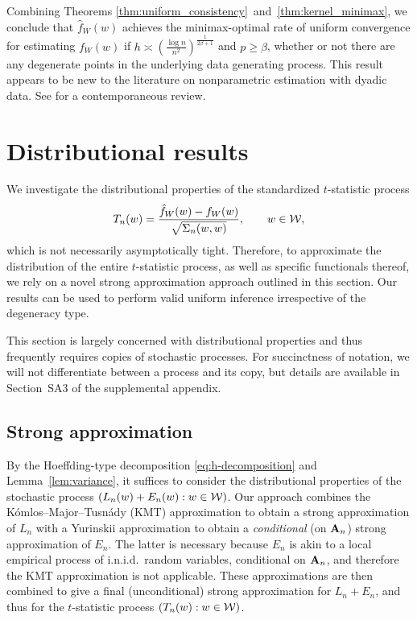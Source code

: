 Combining Theorems \ref{thm:uniform_consistency}~and~\ref{thm:kernel_minimax},
we
conclude that $\hat{f}_W(w)$ achieves the minimax-optimal rate
of uniform convergence for estimating $f_W(w)$ if
$h \asymp \left( \frac{\log n}{n^2} \right)^{\frac{1}{2\beta+1}}$
and $p \geq \beta$,
whether or not there are
any degenerate points in the underlying data generating process.
This result appears to be new to the literature on
nonparametric estimation with dyadic data.
See \citet{gao2021minimax} for a contemporaneous review.

\section{Distributional results}\label{sec:kernel_inference}

We investigate the distributional properties of the
standardized $t$-statistic process
%
\[ T_n(w) = \frac{\hat{f}_W(w) - f_W(w)}{\sqrt{\Sigma_n(w,w)}}
, \qquad w\in\mathcal{W},\]
%
which is not necessarily asymptotically tight.
Therefore, to approximate the distribution of the entire $t$-statistic process,
as well as specific functionals thereof, we rely on a novel strong approximation
approach outlined in this section.
Our results can be used to perform valid uniform inference irrespective of the
degeneracy type.

This section is largely concerned with distributional properties and thus
frequently requires copies of stochastic processes.
For succinctness of notation, we will not differentiate between a process
and its copy, but details are available in
Section~SA3 of the supplemental appendix.

\subsection{Strong approximation}

By the Hoeffding-type decomposition
\eqref{eq:h-decomposition} and Lemma~\ref{lem:variance},
it suffices to consider the distributional properties
of the stochastic process $(L_n(w)+E_n(w):w\in\mathcal{W})$.
Our approach combines the K\'omlos--Major--Tusn\'ady (KMT) approximation
\citep{komlos1975approximation} to obtain a strong approximation of
$L_n$ with a Yurinskii approximation
\citep{yurinskii1978error} to obtain a
\emph{conditional} (on $\mathbf{A}_n$) strong approximation of
$E_n$.
The latter is necessary because
$E_n$ is akin to a local empirical process of i.n.i.d.\
random variables, conditional on $\mathbf{A}_n$,
and therefore the KMT approximation is not applicable.
These approximations are then combined to give a final
(unconditional) strong approximation for $L_n+E_n$,
and thus for the $t$-statistic process
$(T_n(w):w\in\mathcal{W})$.

